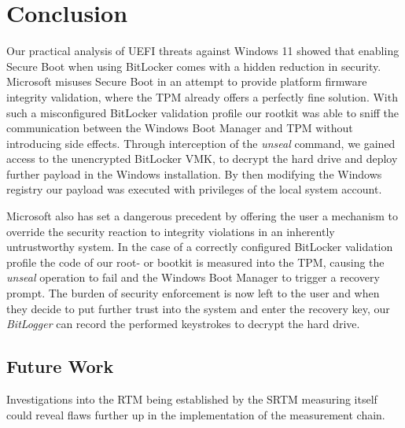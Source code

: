 
\chapter{Conclusion}
\label{sec:conclusion}

Our practical analysis of \ac{UEFI} threats against Windows 11 showed that enabling Secure Boot when using BitLocker comes with a hidden reduction in security.
Microsoft misuses Secure Boot in an attempt to provide platform firmware integrity validation, where the \ac{TPM} already offers a perfectly fine solution.
With such a misconfigured BitLocker validation profile our rootkit was able to sniff the communication between the Windows Boot Manager and \ac{TPM} without introducing side effects.
Through interception of the \emph{unseal} command, we gained access to the unencrypted BitLocker \ac{VMK}, to decrypt the hard drive and deploy further payload in the Windows installation.
By then modifying the Windows registry our payload was executed with privileges of the local system account.

Microsoft also has set a dangerous precedent by offering the user a mechanism to override the security reaction to integrity violations in an inherently untrustworthy system.
In the case of a correctly configured BitLocker validation profile the code of our root- or bootkit is measured into the \ac{TPM}, causing the \emph{unseal} operation to fail and the Windows Boot Manager to trigger a recovery prompt.
The burden of security enforcement is now left to the user and when they decide to put further trust into the system and enter the recovery key, our \emph{BitLogger} can record the performed keystrokes to decrypt the hard drive.

\section*{Future Work}

Investigations into the \ac{RTM} being established by the \ac{SRTM} measuring itself could reveal flaws further up in the implementation of the measurement chain.